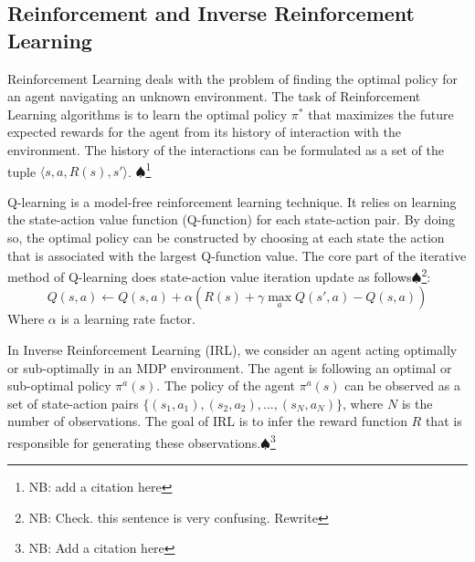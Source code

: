 \documentclass[letterpaper, 10 pt, conference]{ieeeconf}  %
\newcommand\NB[1]{$\spadesuit$\footnote{NB: #1}}
\begin{document}
\subsection{Reinforcement and Inverse Reinforcement Learning}
Reinforcement Learning deals with the problem of finding the optimal policy for an agent navigating an unknown environment. 
The task of Reinforcement Learning algorithms is to learn the optimal policy $\pi^*$ that maximizes the future expected rewards for the agent from its history of interaction with the environment. The history of the interactions can be formulated as a set of the tuple $\big \langle s,a,R(s),s' \big \rangle$. \NB{add a citation here}

Q-learning is a model-free reinforcement learning technique. It relies on learning the state-action value function (Q-function) for each state-action pair. By doing so, the optimal policy can be constructed by choosing at each state the action that is associated with the largest Q-function value. The core part of the iterative method of Q-learning does state-action value iteration update as follows\NB{Check. this sentence is very confusing. Rewrite}:
\begin{equation}\label{eq:qlearn}
    Q(s,a) \leftarrow Q(s,a) + \alpha ( R(s) + \gamma \max_{a} Q(s',a) - Q(s,a))
\end{equation}
Where $\alpha$ is a learning rate factor.

In Inverse Reinforcement Learning (IRL), we consider an agent acting optimally or sub-optimally in an MDP environment. The agent is following an optimal or sub-optimal policy $\pi^a(s)$. The policy of the agent $\pi^a(s)$ can be observed as a set of state-action pairs $\{(s_1,a_1),(s_2,a_2), ...,(s_N,a_N)\}$, where $N$ is the number of observations. The goal of IRL is to infer the reward function $R$ that is responsible for generating these observations.\NB{Add a citation here} 
\end{document}
